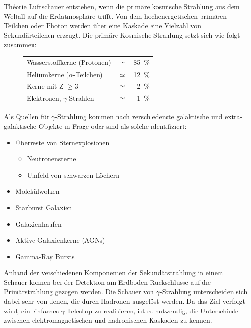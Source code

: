 \documentclass[a4paper,11pt,liststotocnumbered,bibtotocnumbered]{scrartcl}
\begin{document}
 \begin{section}{Théorie}
   Luftschauer entstehen, wenn die primäre kosmische Strahlung aus dem Weltall auf die Erdatmosphäre trifft. Von dem hochenergetischen primären Teilchen oder Photon werden über eine Kaskade eine Vielzahl von Sekundärteilchen erzeugt. Die primäre Kosmische Strahlung setzt sich wie folgt zusammen:
   \begin{figure}[htb]
    \centering
    \begin{tabular}{lcr}
     Wasserstoffkerne (Protonen) & $\simeq$ & 85~\%\\
     Heliumkerne ($\alpha$-Teilchen) & $\simeq$ & 12~\%\\
     Kerne mit Z $\geq 3$	& $\simeq$ & 2~\%\\ 
     Elektronen, $\gamma$-Strahlen	& $\simeq$ & 1~\%\\
    \end{tabular}\cite[S. 14]{burak}
   \end{figure}	

   Als Quellen für $\gamma$-Strahlung kommen nach \cite{astroteilchen} verschiedenste galaktische und extra-galaktische Objekte in Frage oder sind als solche identifiziert:
   \begin{itemize}
    \item Überreste von Sternexplosionen
    \begin{itemize}
     \item Neutronensterne
     \item Umfeld von schwarzen Löchern
    \end{itemize}
    \item Molekülwolken
    \item Starburst Galaxien
    \item Galaxienhaufen
    \item Aktive Galaxienkerne (AGNs)
    \item Gamma-Ray Bursts
   \end{itemize}
   Anhand der verschiedenen Komponenten der Sekundärstrahlung in einem Schauer können bei der Detektion am Erdboden Rückschlüsse auf die Primärstrahlung gezogen werden.
   Die Schauer von $\gamma$-Strahlung unterscheiden sich dabei sehr von denen, die durch Hadronen ausgelöst werden. Da das Ziel verfolgt wird, ein einfaches $\gamma$-Teleskop zu realisieren, ist es notwendig, die Unterschiede zwischen elektromagnetischen und hadronischen Kaskaden zu kennen.



\end{section}
\end{document}
